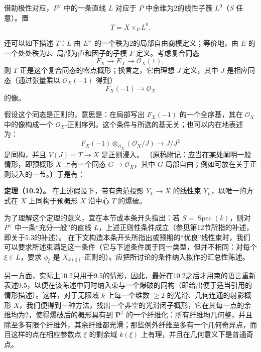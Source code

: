 借助极性对应，$P^\vee$ 中的一条直线 $L$ 对应于 $P$ 中余维为2的线性子簇 $L^0$（$S$ 任意）。置
\[
T=X\times_P L^0.
\]

还可以如下描述 $T$：$L$ 由 $E^\vee$ 的一个秩为2的局部自由商模定义；等价地，由 $E$ 的一个处处秩为2、局部为直和因子的子模 $F$ 定义。考虑复合同态
\[
F_X\longrightarrow E_X\longrightarrow\mathcal O_X(1),
\]
则 $T$ 正是这个复合同态的零点概形；换言之，它由理想 $J$ 定义，其中 $J$ 是相应同态（通过张量乘以 $\mathcal O_X(-1)$ 得到）
\[
F_X(-1)\longrightarrow\mathcal O_X
\]
的像。

假设这个同态是正则的，意思是：在局部写出 $F_X(-1)$ 的一个全序基，其在 $\mathcal O_X$ 中的像构成一个 $\mathcal O_X$-正则序列。这个条件与所选的基无关；也可以内在地表述为：
\[
F_X(-1)\otimes_{\mathcal O_X}(\mathcal O_X/J)
\longrightarrow J/J^2
\]
是同构，并且 $V(J)=T\to X$ 是正则浸入。
〔原稿附记：应当在某处阐明一般情形，即预概形 $X$ 上有一个同态 $G\to\mathcal O_X$，其中 $G$ 局部自由；例如可放在关于正则浸入的一节。〕于是有：

\par\noindent\textbf{定理（10.2）。}
在上述假设下，带有典范投影 $Y_L\to X$ 的线性束 $Y_L$，以唯一的方式在 $X$ 上同构于预概形 $X$ 沿中心 $T$ 的爆破。

为了理解这个定理的意义，宜在本节或本条开头指出：若 $S=\operatorname{Spec}(k)$，则对 $P^\vee$ 中一条“充分一般”的直线 $L$，上述正则性条件成立（参见第12节所指的补述，即关于5.3的补述）。
在下文构造本条开头所指出或预期的“优良”线性束时，我们可以要求所述束满足这一条件（它与下述条件属于同一类型，但并不相同：对每个 $\xi\in L$，要求 $\phi_\xi$ 是 $X_{k(\xi)}$-正则的）。应把所讨论的条件纳入拟作的汇总性陈述。

另一方面，实际上10.2只用于9.5的情形，因此，最好在10.2之后才用束的语言重新表述9.5，以便在该陈述中同时纳入束与一个爆破的同构（即给出便于适当引用的情形描述）。这样，对于无限域 $k$ 上每一个维数 $\ge2$ 的光滑、几何连通的射影概形 $X$，我们便得到一种方法，找出一个非空的光滑闭子概形，它在其每一点的余维均为2，使得爆破后的概形具有到 $\mathbf P^1$ 的一个纤维化：所有纤维均几何整，并且除至多有限个纤维外，其余纤维都光滑；那些例外纤维至多有一个几何奇异点，而且这样的点在相应参数点 $\xi$ 的剩余域 $k(\xi)$ 上有理，并且在几何意义下是普通奇点。


